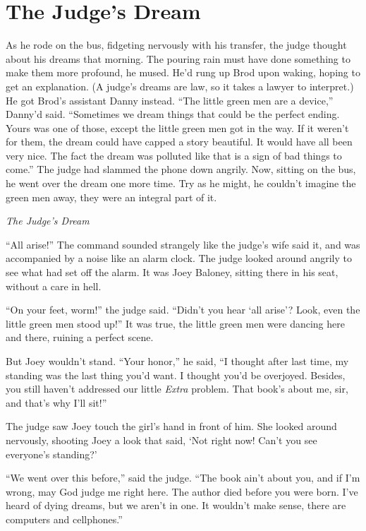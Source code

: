 \documentclass[oneside]{book}
\begin{document}
\chapter{The Judge's Dream}


As he rode on the bus, fidgeting nervously with his transfer,
the judge thought about his dreams that morning.
The pouring rain must have done something to make them more profound, he
mused.  He'd rung up Brod upon waking, hoping to get an explanation.
(A judge's dreams are law, so it takes a lawyer to interpret.)
He got Brod's assistant Danny instead.  ``The little green men are a device,''
Danny'd said.  ``Sometimes we dream things that could be the perfect ending.
Yours was one of those, except the little green men got in the way.
If it weren't for them, the dream could have capped a story beautiful.  It would
have all been very nice.  The fact the dream was polluted like that is
a sign of bad things to come.''  The judge had slammed the phone down angrily.
Now, sitting on the bus, he went over the dream one more time.
Try as he might, he couldn't imagine the green men away, they were an
integral part of it.

\vspace{2mm}
\noindent \textit{The Judge's Dream}
\vspace{2mm}

``All arise!'' The command sounded strangely like the judge's wife said it, and
was accompanied by a noise like an alarm clock.  The judge looked around
angrily to see what had set off the alarm.  It was Joey Baloney, sitting
there in his seat, without a care in hell.

``On your feet, worm!'' the judge said.  ``Didn't you hear `all arise'?  Look,
even the little green men stood up!''  It was true, the little green men
were dancing here and there, ruining a perfect scene.

But Joey wouldn't stand.  ``Your honor,'' he said, ``I thought after last time,
my standing was the last thing you'd want.  I thought you'd be overjoyed.
Besides, you still haven't addressed our little \emph{Extra}
problem.  That book's about me, sir, and that's why I'll sit!''

The judge saw Joey touch the girl's hand in front of him.  She looked around
nervously, shooting Joey a look that said, `Not right now!  Can't you see everyone's
standing?'

``We went over this before,'' said the judge.  ``The book ain't about you,
and if I'm wrong, may God judge me right here.  The author died before you were born.
I've heard of dying dreams, but we aren't in one.
It wouldn't make sense, there are computers and cellphones.''
\end{document}
